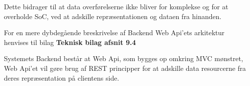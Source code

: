 \noindent Dette bidrager til at data overførelserne ikke bliver for komplekse og for at overholde SoC, ved at adskille repræsentationen og dataen fra hinanden.

For en mere dybdegående breskrivelse af Backend Web Api'ets arkitektur henvises til bilag \textbf{Teknisk bilag afsnit 9.4}

Systemets Backend består at Web Api, som bygges op omkring MVC mønstret, Web Api’et vil gøre brug af REST principper for at adskille data resourcerne fra deres repræsentation på clientens side.

\newpage

